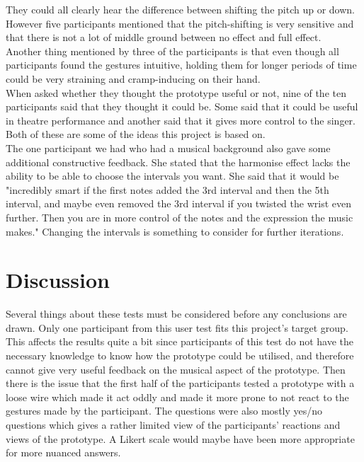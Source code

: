 They could all clearly hear the difference between shifting the pitch up or down. However five participants mentioned that the pitch-shifting is very sensitive and that there is not a lot of middle ground between no effect and full effect. \\

Another thing mentioned by three of the participants is that even though all participants found the gestures intuitive, holding them for longer periods of time could be very straining and cramp-inducing on their hand. \\

When asked whether they thought the prototype useful or not, nine of the ten participants said that they thought it could be. Some said that it could be useful in theatre performance and another said that it gives more control to the singer. Both of these are some of the ideas this project is based on. \\

The one participant we had who had a musical background also gave some additional constructive feedback. She stated that the harmonise effect lacks the ability to be able to choose the intervals you want. She said that it would be "incredibly smart if the first notes added the 3rd interval and then the 5th interval, and maybe even removed the 3rd interval if you twisted the wrist even further. Then you are in more control of the notes and the expression the music makes." Changing the intervals is something to consider for further iterations. 

\section{Discussion}


Several things about these tests must be considered before any conclusions are drawn. Only one participant from this user test fits this project's target group. This affects the results quite a bit since participants of this test do not have the necessary knowledge to know how the prototype could be utilised, and therefore cannot give very useful feedback on the musical aspect of the prototype.
Then there is the issue that the first half of the participants tested a prototype with a loose wire which made it act oddly and made it more prone to not react to the gestures made by the participant. The questions were also mostly yes/no questions which gives a rather limited view of the participants' reactions and views of the prototype. A Likert scale would maybe have been more appropriate for more nuanced answers.

